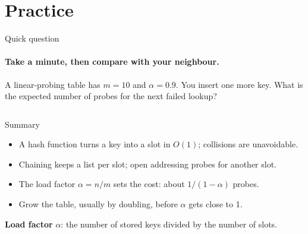 \documentclass[aspectratio=169,11pt,t]{beamer}
\begin{document}
\section{Practice}

\begin{frame}{Quick question}
  \framesubtitle{Take a minute, then compare with your neighbour.}
  \vspace{1mm}
  {\small A linear-probing table has $m = 10$ and $\alpha = 0.9$. You insert one more key.
  What is the expected number of probes for the next failed lookup?\par}
  \vspace{2.5mm}
  \begin{columns}[T,onlytextwidth]
  \end{columns}
  \vspace{3mm}
\end{frame}

\begin{frame}{Summary}
  \begin{itemize}
    \item A hash function turns a key into a slot in $O(1)$; collisions are unavoidable.
    \item Chaining keeps a list per slot; open addressing probes for another slot.
    \item The load factor $\alpha = n/m$ sets the cost: about $1/(1-\alpha)$ probes.
    \item Grow the table, usually by doubling, before $\alpha$ gets close to 1.
  \end{itemize}
  \vspace{3mm}
  \begin{definitionbox}
    \textbf{Load factor} $\alpha$: the number of stored keys divided by the number of slots.
  \end{definitionbox}
\end{frame}
\end{document}
